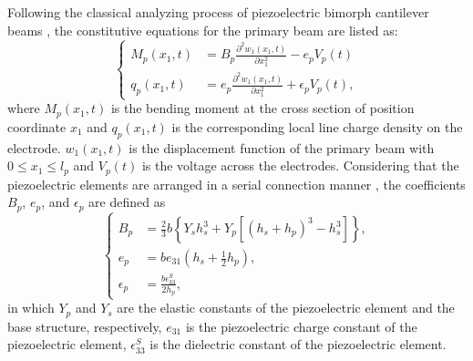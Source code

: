 \documentclass{elsarticle}
\begin{document}
Following the classical analyzing process of piezoelectric bimorph cantilever beams \cite{erturk2008distributed,erturk2009experimentally,park2003dynamics}, the constitutive equations for the primary beam are listed as:
\begin{equation}
    \left\{\begin{aligned}
        M_p(x_1,t) &= B_p \frac{\partial^2 w_1(x_1,t)}{\partial x_1^2} - e_p V_p (t) \\
        q_p(x_1,t) &= e_p \frac{\partial^2 w_1(x_1,t)}{\partial x_1^2} + \epsilon_p V_p (t),
    \end{aligned}\right.
    \label{eq:eq_primary_beam_consitutive_equation}
\end{equation}
where $M_p(x_1,t)$ is the bending moment at the cross section of position coordinate $x_1$ and $q_p(x_1,t)$ is the corresponding local line charge density on the electrode. $w_1(x_1,t)$ is the displacement function of the primary beam with $0 \leq x_1 \leq l_p$ and $V_p(t)$ is the voltage across the electrodes. Considering that the piezoelectric elements are arranged in a serial connection manner \cite{erturk2009experimentally}, the coefficients $B_p$, $e_p$, and $\epsilon_p$ are defined as
\begin{equation}
    \left\{\begin{aligned}
        B_p &= \frac{2}{3}b\left\{ Y_s h_s^3 + Y_p \left[ (h_s+h_p)^3 - h_s^3 \right] \right\}, \\
        e_p &= b e_{31}\left(h_s+\frac{1}{2}h_p\right), \\
        \epsilon_p &= \frac{b \epsilon_{33}^S}{2 h_p},
    \end{aligned}\right.
    \label{eq:eq_primary_beam_consitutive_equation_coefficients}
\end{equation}
in which $Y_p$ and $Y_s$ are the elastic constants of the piezoelectric element and the base structure, respectively, $e_{31}$ is the piezoelectric charge constant of the piezoelectric element, $\epsilon_{33}^S$ is the dielectric constant of the piezoelectric element.
\end{document}
